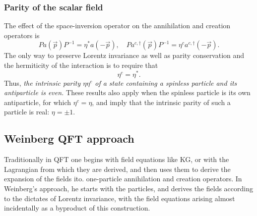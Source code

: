 \subsubsection{Parity of the scalar field}
The effect of the space-inversion operator on the annihilation and creation operators is
\begin{equation}
	P a(\vec{p})P^{-1} = \eta^* a(-\vec{p}), \quad P a^{c,\dagger}(\vec{p}) P^{-1} = \eta^c a^{c,\dagger} (-\vec{p}).
\end{equation}
The only way to preserve Lorentz invariance as well as parity conservation and the hermiticity of the interaction is to require that 
\begin{equation}
	\eta^c = \eta^*.
\end{equation}
Thus, \emph{the intrinsic parity $\eta \eta^c$ of  a state containing a spinless particle and its antiparticle is even.} These results also apply when the spinless particle is its own antiparticle, for which $\eta^c=\eta$, and imply that the intrinsic parity of such a particle is real: $\eta=\pm1$.


\subsection{Weinberg QFT approach}
Traditionally in QFT one begins with field equations like KG, or with the Lagrangian from which they are derived, and then uses them to derive the expansion of the fields ito. one-particle annihilation and creation operators. In Weinberg's approach, he starts with the particles, and derives the fields according to the dictates of Lorentz invariance, with the field equations arising almost incidentally as a byproduct of this construction.
















